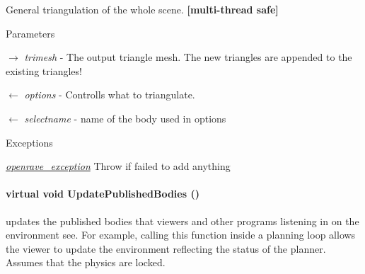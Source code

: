 General triangulation of the whole scene. {\bfseries \mbox{[}multi-\/thread safe\mbox{]}} 


\begin{DoxyParams}{Parameters}
\item[\mbox{$\rightarrow$} {\em trimesh}]-\/ The output triangle mesh. The new triangles are appended to the existing triangles! \item[\mbox{$\leftarrow$} {\em options}]-\/ Controlls what to triangulate. \item[\mbox{$\leftarrow$} {\em selectname}]-\/ name of the body used in options \end{DoxyParams}

\begin{DoxyExceptions}{Exceptions}
\item[{\em \hyperlink{classOpenRAVE_1_1openrave__exception}{openrave\_\-exception}}]Throw if failed to add anything \end{DoxyExceptions}
\hypertarget{classOpenRAVE_1_1EnvironmentBase_a590ea693633476a7aa2bc1c79bff8549}{
\paragraph[{UpdatePublishedBodies}]{\setlength{\rightskip}{0pt plus 5cm}virtual void UpdatePublishedBodies ()}\hfill}
\label{classOpenRAVE_1_1EnvironmentBase_a590ea693633476a7aa2bc1c79bff8549}
updates the published bodies that viewers and other programs listening in on the environment see. For example, calling this function inside a planning loop allows the viewer to update the environment reflecting the status of the planner. Assumes that the physics are locked. 